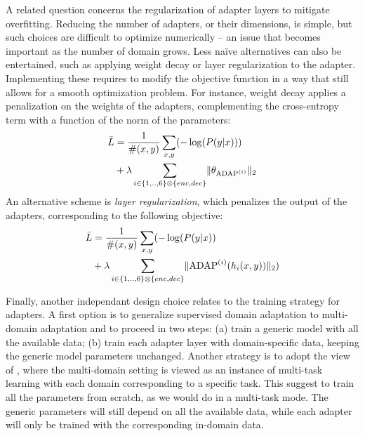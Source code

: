 \documentclass[11pt,a4paper]{article}
\newcommand{\fyDone}[1]{\done[FY]\Todo[FY:]{\textcolor{orange}{#1}}}
\newcommand{\fyFuture}[1]{\done[FY]\Todo[FY:]{\textcolor{red}{#1}}}
\begin{document}
A related question concerns the regularization of adapter layers to mitigate overfitting. Reducing the number of adapters, or their dimensions, is simple, but such choices are difficult to optimize numerically -- an issue that becomes important as the number of domain grows. Less naïve alternatives can also be entertained, such as applying weight decay or layer regularization to the adapter. Implementing these requires to modify the objective function in a way that still allows for a smooth optimization problem. For instance, weight decay applies a penalization on the weights of the adapters, complementing the cross-entropy term with a function of the norm of the parameters: \fyDone{The second summation also runs over $x,y$ ? I think not}
\begin{equation*}
  \begin{split}
    \bar{L} & = \frac{1}{\#(x,y)}\mathop{\sum}_{x,y}( - \log(P(y|x))) \\
    & + \lambda  \sum_{i \in \{1,..,6\} \otimes \{enc, dec\}} \normL{\theta_{\operatorname{ADAP}^{(i)}}}
  \end{split}
\end{equation*}
An alternative scheme is \emph{layer regularization}, which penalizes the output of the adapters, corresponding to the following objective:
\begin{equation*}
  \begin{split}
    \bar{L} & = \frac{1}{\#(x,y)}\mathop{\sum}_{x,y} (-\log(P(y|x)) \\
    & + \lambda \sum_{i \in \{1,..,6\} \otimes \{enc, dec\}} \normL{\operatorname{ADAP}^{(i)}(h_i(x,y))})
  \end{split}
\end{equation*}

Finally, another independant design choice relates to the training strategy for adapters. A first option is to generalize supervised domain adaptation to multi-domain adaptation and to proceed in two steps: (a) train a generic model with all the available data; (b) train each adapter layer with domain-specific data, keeping the generic model parameters unchanged. Another strategy is to adopt the view of \citet{Dredze08online}, where the multi-domain setting is viewed as an instance of multi-task learning \cite{Caruana97multitask} with each domain corresponding to a specific task. This suggest to train all the parameters from scratch, as we would do in a multi-task mode. The generic parameters will still depend on all the available data, while each adapter will only be trained with the corresponding in-domain data.\fyFuture{Does everyone need a domain?}
\end{document}
